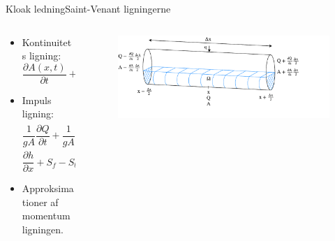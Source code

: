 \begin{frame}{Kloak ledning}{Saint-Venant ligningerne}{}
	\vfill\vfill\centering
	
\begin{columns}
		\begin{column}{0.4\textwidth}
			\begin{itemize}
				\item<1-> Kontinuitets ligning: \\ \vspace{2mm} $\dfrac{\partial A(x,t)}{\partial t} + \dfrac{\partial Q(x,t)}{\partial x}=0$
				\vspace{7mm}
				\item<2-> Impuls ligning: \\ \vspace{2mm} $\dfrac{1}{gA} \dfrac{\partial Q}{\partial t} +\dfrac{1}{gA}\dfrac{\partial}{\partial x} \left( \dfrac{Q^2}{A} \right) +$ \\
				\vspace{3mm}
				$\dfrac{\partial h}{\partial x} + S_f - S_b = 0$
				\vspace{7mm}
				\item<3-> Approksimationer af momentum ligningen.
			\end{itemize}
		\end{column}
		\begin{column}{0.48\textwidth}
			\vspace{15mm}
			\begin{figure}[H]
				\centering
				\includegraphics[width=1.2\textwidth]{Sections/pictures/continuity_open_channel.pdf}
			\end{figure}
		\end{column}
	\end{columns}
\vfill\vfill		
\end{frame}

